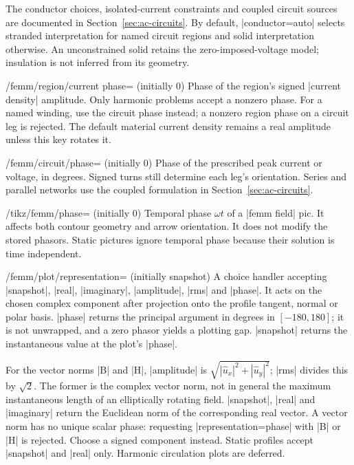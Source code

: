 The conductor choices, isolated-current constraints and coupled circuit
sources are documented in Section~\ref{sec:ac-circuits}. By default,
|conductor=auto| selects stranded interpretation for named circuit regions
and solid interpretation otherwise. An unconstrained solid retains the
zero-imposed-voltage model; insulation is not inferred from its geometry.

\begin{key}{/femm/region/current phase= (initially 0)}
Phase of the region's signed |current density| amplitude. Only harmonic
problems accept a nonzero phase. For a named winding, use the circuit phase
instead; a nonzero region phase on a circuit leg is rejected. The default
material current density remains a real amplitude unless this key rotates it.
\end{key}

\begin{key}{/femm/circuit/phase= (initially 0)}
Phase of the prescribed peak current or voltage, in degrees. Signed turns
still determine each leg's orientation. Series and parallel networks use the
coupled formulation in Section~\ref{sec:ac-circuits}.
\end{key}

\begin{key}{/tikz/femm/phase= (initially 0)}
Temporal phase $\omega t$ of a |femm field| pic. It affects both contour geometry
and arrow orientation. It does not modify the stored phasors. Static pictures
ignore temporal phase because their solution is time independent.
\end{key}

\begin{key}{/femm/plot/representation= (initially snapshot)}
A choice handler accepting |snapshot|, |real|, |imaginary|, |amplitude|, |rms|
and |phase|. It acts on the chosen complex component after projection onto the
profile tangent, normal or polar basis. |phase| returns the principal argument
in degrees in $[-180,180]$; it is not unwrapped, and a zero phasor yields a
plotting gap. |snapshot| returns the instantaneous value at the plot's |phase|.

For the vector norms |B| and |H|, |amplitude| is
$\sqrt{|\widehat u_x|^2+|\widehat u_y|^2}$; |rms| divides this by $\sqrt2$.
The former is the complex vector norm, not in general the maximum instantaneous
length of an elliptically rotating field. |snapshot|, |real| and |imaginary|
return the Euclidean norm of the corresponding real vector. A vector norm has
no unique scalar phase: requesting |representation=phase| with |B| or |H| is
rejected. Choose a signed component instead. Static profiles accept |snapshot|
and |real| only. Harmonic circulation plots are deferred.
\end{key}

